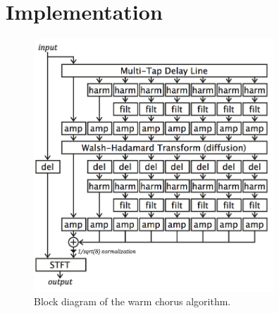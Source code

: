 \section{Implementation}
\begin{figure}[ht]
\centering
\includegraphics[width= 9cm]{Structure.png}
\caption{Block diagram of the warm chorus algorithm. \cite{dudas}}
\label{fig_struct}
\end{figure}